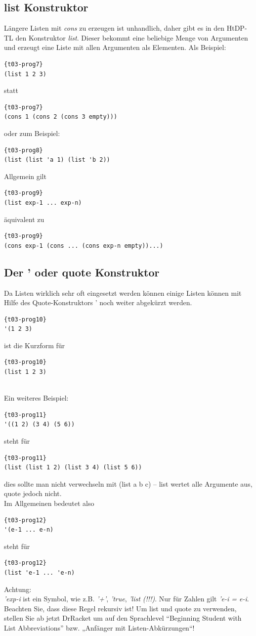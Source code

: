 \subsection{list Konstruktor}
Längere Listen mit \textit{cons} zu erzeugen ist unhandlich, daher gibt es in den HtDP-TL den Konstruktor \textit{list}. Dieser bekommt eine beliebige Menge von Argumenten und erzeugt eine Liste mit allen Argumenten als Elementen. Als Beispiel:

\begin{lstlisting}{t03-prog7}
(list 1 2 3)
\end{lstlisting}
statt
\begin{lstlisting}{t03-prog7}
(cons 1 (cons 2 (cons 3 empty)))
\end{lstlisting}
oder zum Beispiel:
\begin{lstlisting}{t03-prog8}
(list (list 'a 1) (list 'b 2))
\end{lstlisting}

Allgemein gilt
\begin{lstlisting}{t03-prog9}
(list exp-1 ... exp-n)
\end{lstlisting}
 äquivalent zu
\begin{lstlisting}{t03-prog9}
(cons exp-1 (cons ... (cons exp-n empty))...)
\end{lstlisting}

\subsection{Der ' oder quote Konstruktor}
Da Listen wirklich sehr oft eingesetzt werden können einige Listen können mit Hilfe des Quote-Konstruktors ' noch weiter abgekürzt werden.
\begin{lstlisting}{t03-prog10}
'(1 2 3)
\end{lstlisting}
ist die Kurzform für
\begin{lstlisting}{t03-prog10}
(list 1 2 3)
\end{lstlisting}
\\
Ein weiteres Beispiel:
\begin{lstlisting}{t03-prog11}
'((1 2) (3 4) (5 6))
\end{lstlisting}
steht für
\begin{lstlisting}{t03-prog11}
(list (list 1 2) (list 3 4) (list 5 6))
\end{lstlisting}
dies sollte man nicht verwechseln mit (list a b c) – list wertet alle
Argumente aus, quote jedoch nicht. \\Im Allgemeinen bedeutet also
\begin{lstlisting}{t03-prog12}
'(e-1 ... e-n)
\end{lstlisting}
steht für
\begin{lstlisting}{t03-prog12}
(list 'e-1 ... 'e-n)
\end{lstlisting}
Achtung:\\
\textit{'exp-i} ist ein Symbol, wie z.B. \textit{'+'}, \textit{'true}, \textit{'list (!!!)}. Nur für Zahlen gilt \textit{'e-i = e-i}. Beachten Sie, dass diese Regel rekursiv ist! Um list und quote zu verwenden, stellen Sie ab jetzt DrRacket um auf den Sprachlevel “Beginning Student with List Abbreviations” bzw. „Anfänger mit Listen-Abkürzungen“!

